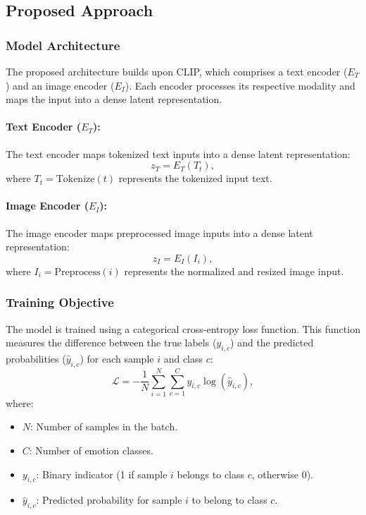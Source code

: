 \documentclass{article}
\theoremstyle{plain}
\theoremstyle{definition}
\theoremstyle{remark}
\begin{document}
\subsection{Proposed Approach}
\subsubsection{Model Architecture}
The proposed architecture builds upon CLIP, which comprises a text encoder (\(E_T\)) and an image encoder (\(E_I\)). Each encoder processes its respective modality and maps the input into a dense latent representation.

\paragraph{Text Encoder (\(E_T\)):}  
The text encoder maps tokenized text inputs into a dense latent representation:
\[
z_T = E_T(T_t),
\]
where \(T_t = \text{Tokenize}(t)\) represents the tokenized input text.

\paragraph{Image Encoder (\(E_I\)):}  
The image encoder maps preprocessed image inputs into a dense latent representation:
\[
z_I = E_I(I_i),
\]
where \(I_i = \text{Preprocess}(i)\) represents the normalized and resized image input.

\subsubsection{Training Objective}
The model is trained using a categorical cross-entropy loss function. This function measures the difference between the true labels (\(y_{i,c}\)) and the predicted probabilities (\(\hat{y}_{i,c}\)) for each sample \(i\) and class \(c\):
\[
\mathcal{L} = -\frac{1}{N} \sum_{i=1}^N \sum_{c=1}^C y_{i,c} \log(\hat{y}_{i,c}),
\]
where:
\begin{itemize}
    \item \(N\): Number of samples in the batch.
    \item \(C\): Number of emotion classes.
    \item \(y_{i,c}\): Binary indicator (1 if sample \(i\) belongs to class \(c\), otherwise 0).
    \item \(\hat{y}_{i,c}\): Predicted probability for sample \(i\) to belong to class \(c\).
\end{itemize}
\end{document}
